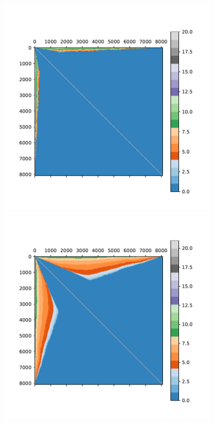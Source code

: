 \documentclass[aps, pre, twocolumn, nofootinbib]{revtex4-1}
\begin{document}
\begin{figure}[htbp]  
	\centering
	\includegraphics[scale = 0.33]{plots/d_m_1990}
	\includegraphics[scale = 0.33]{plots/d_m_2000}

\end{figure}
\end{document}
